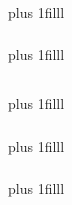 \documentclass[fleqn]{beamer} %
\newcommand{\sectionIIsubsectionIItitle}{}
\newcommand{\sectionIIsubsectionIIItitle}{}
\newcommand{\sectionIIsubsectionIVtitle}{}
\newcommand{\btVFill}{\vskip0pt plus 1filll}
\begin{document}
			\begin{frame}
				\frametitle{\sectionIIsubsectionIItitle} \scriptsize
				\bigskip

				
				\btVFill
				

			\end{frame}

			\begin{frame}
				\frametitle{\sectionIIsubsectionIItitle} \scriptsize
	
				\bigskip

				
				\btVFill
			
				
			\end{frame}

		\subsection{\sectionIIsubsectionIIItitle}\label{sectionIIsubsectionIII}

			\begin{frame}
				\frametitle{\sectionIIsubsectionIIItitle} 

				\bigskip

				
				\btVFill
				

			\end{frame}

			\begin{frame}
				\frametitle{\sectionIIsubsectionIIItitle}

				\bigskip


				\btVFill
			
			\end{frame}

			\begin{frame}
			\frametitle{\sectionIIsubsectionIIItitle}




				\btVFill

			\end{frame}

		\subsection{\sectionIIsubsectionIVtitle}\label{sectionIIsubsectionIV}

			\begin{frame}
				\frametitle{\sectionIIsubsectionIVtitle}

			\end{frame}

			\begin{frame}
				\frametitle{\sectionIIsubsectionIVtitle}


			\end{frame}
		
\end{document}
